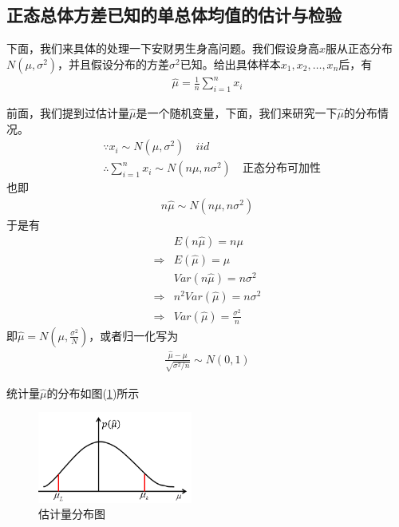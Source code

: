     \subsection{正态总体方差已知的单总体均值的估计与检验}
        \label{sec:单总体均值的估计与检验}
        \par
        下面，我们来具体的处理一下安财男生身高问题。我们假设身高$x$服从正态分布$N(\mu,\sigma^2)$，并且假设分布的方差$\sigma^2$已知。给出具体样本$x_1,x_2,\dots,x_n$后，有
        \begin{align*}
        \hat{\mu} = \frac{1}{n} \sum_{i = 1}^n x_i
        \end{align*}
        \par
        前面，我们提到过估计量$\hat{\mu}$是一个随机变量，下面，我们来研究一下$\hat{\mu}$的分布情况。
        \begin{align*}
        &\because x_i\sim N(\mu,\sigma^2) \quad iid\\
        &\therefore \sum_{i = 1}^nx_i \sim N(n\mu,n\sigma^2) \quad \text{正态分布可加性}
        \end{align*}
        也即
        \begin{align*}
        n\hat{\mu}\sim N(n\mu,n\sigma^2)
        \end{align*}
        于是有
        \begin{align*}
        &E(n\hat{\mu}) = n \mu\\
        \Rightarrow{}& E(\hat{\mu}) = \mu\\
        &Var(n\hat{\mu}) = n\sigma^2\\
        \Rightarrow{}&n^2 Var(\hat{\mu}) = n\sigma^2\\
        \Rightarrow{}&Var(\hat{\mu}) = \frac{\sigma^2}{n}
        \end{align*}
        即$\hat{\mu} = N(\mu,\frac{\sigma^2}{N})$，或者归一化写为
        \begin{align*}
        \frac{\hat{\mu} - \mu}{\sqrt{\sigma^2/n}}\sim N(0,1)
        \end{align*}
        \par
        统计量$\hat{\mu}$的分布如图(\ref{fig:估计量分布图})所示
            \begin{figure}[H]
            \centering
            \includegraphics[height=3cm]{images/Estimation_of_the_distribution.jpg}
            \caption{估计量分布图}
            \label{fig:估计量分布图}
            \end{figure}
